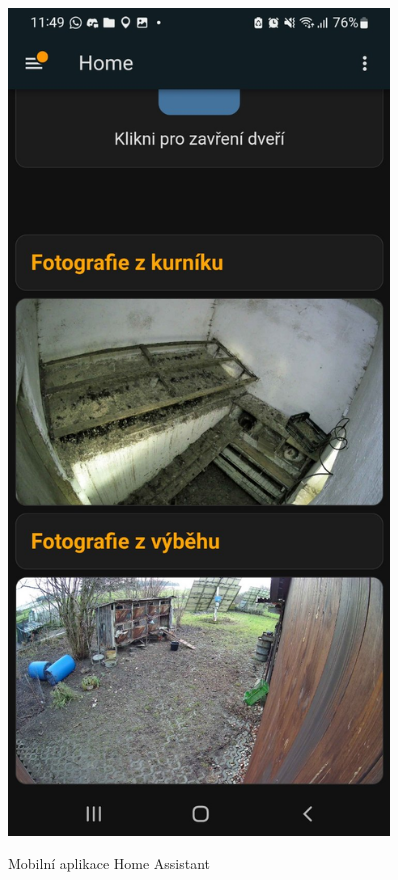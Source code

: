 \begin{figure}[htbp]
\begin{minipage}[t]{0.5\textwidth}
        \label{fig:mobilni_apka1}
    \end{minipage}%
    \begin{minipage}[t]{0.5\textwidth}
        \centering
        \includegraphics[width=0.9\textwidth]{img/mobilni_apka2}
        \label{fig:mobilni_apka2}
    \end{minipage}
    \caption{Mobilní aplikace Home Assistant}
\end{figure}

